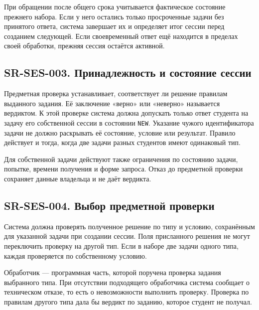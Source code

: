 \documentclass[12pt,a4paper]{article}
\begin{document}
При обращении после общего срока учитывается фактическое состояние прежнего набора. Если у него остались только просроченные задачи без принятого ответа, система завершает их и определяет итог сессии перед созданием следующей. Если своевременный ответ ещё находится в пределах своей обработки, прежняя сессия остаётся активной.

\subsection{SR-SES-003. Принадлежность и состояние сессии}\label{sr-ses-003-ux43fux440ux438ux43dux430ux434ux43bux435ux436ux43dux43eux441ux442ux44c-ux438-ux441ux43eux441ux442ux43eux44fux43dux438ux435-ux441ux435ux441ux441ux438ux438}

\hypertarget{sr-ses-003-принадлежность-и-состояние-сессии}{}

\hypertarget{sr-ses-003}{}

Предметная проверка устанавливает, соответствует ли решение правилам выданного задания. Её заключение «верно» или «неверно» называется вердиктом. К этой проверке система должна допускать только ответ студента на задачу его собственной сессии в состоянии \texttt{NEW}. Указание чужого идентификатора задачи не должно раскрывать её состояние, условие или результат. Правило действует и тогда, когда две задачи разных студентов имеют одинаковый тип.

Для собственной задачи действуют также ограничения по состоянию задачи, попытке, времени получения и форме запроса. Отказ до предметной проверки сохраняет данные владельца и не даёт вердикта.

\subsection{SR-SES-004. Выбор предметной проверки}\label{sr-ses-004-ux432ux44bux431ux43eux440-ux43fux440ux435ux434ux43cux435ux442ux43dux43eux439-ux43fux440ux43eux432ux435ux440ux43aux438}

\hypertarget{sr-ses-004-выбор-предметной-проверки}{}

\hypertarget{sr-ses-004}{}

Система должна проверять полученное решение по типу и условию, сохранённым для указанной задачи при создании сессии. Поля присланного решения не могут переключить проверку на другой тип. Если в наборе две задачи одного типа, каждая проверяется по собственному условию.

Обработчик --- программная часть, которой поручена проверка задания выбранного типа. При отсутствии подходящего обработчика система сообщает о техническом отказе, то есть о невозможности выполнить проверку. Проверка по правилам другого типа дала бы вердикт по заданию, которое студент не получал.
\end{document}

